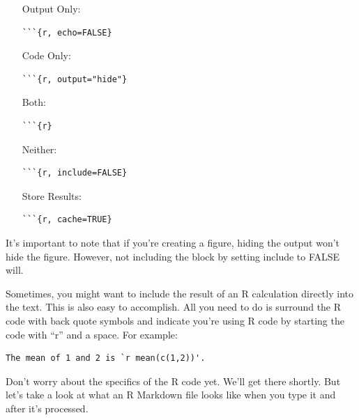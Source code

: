 \documentclass[12pt]{article}
\begin{document}
\begin{changemargin}{5cm}{0cm}
    \begin{itemize}
    \item [Output Only:] \begin{verbatim}```{r, echo=FALSE}\end{verbatim}
    \item [Code Only:] \begin{verbatim}```{r, output="hide"}\end{verbatim}
    \item [Both:] \begin{verbatim}```{r}\end{verbatim}
    \item [Neither:] \begin{verbatim}```{r, include=FALSE}\end{verbatim}
    \item [Store Results:] \begin{verbatim}```{r, cache=TRUE}\end{verbatim}
    \end{itemize}
\end{changemargin}

It's important to note that if you're creating a figure, hiding the output won't
hide the figure. However, not including the block by setting include to FALSE will.

Sometimes, you might want to include the result of an R calculation directly into the
text. This is also easy to accomplish. All you need to do is surround the R code with
back quote symbols and indicate you're using R code by starting the code with ``r''
and a space. For example:

\begin{verbatim}
The mean of 1 and 2 is `r mean(c(1,2))'.
\end{verbatim}

Don't worry about the specifics of the R code yet. We'll get there shortly. But let's
take a look at what an R Markdown file looks like when you type it and after it's
processed.
\end{document}
